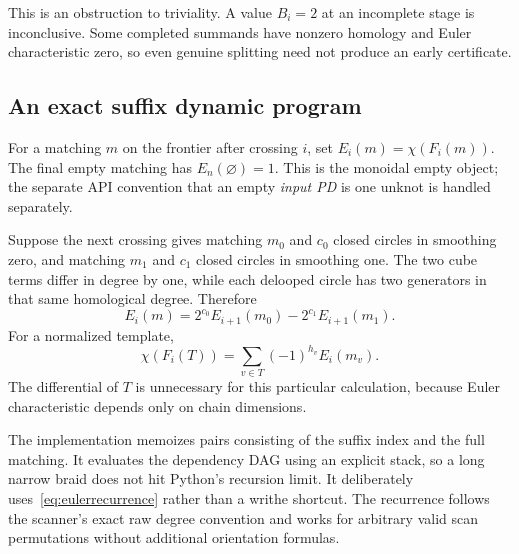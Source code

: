This is an obstruction to triviality. A value $B_i=2$ at an incomplete stage
is inconclusive. Some completed summands have nonzero homology and Euler
characteristic zero, so even genuine splitting need not produce an early
certificate.

\subsection{An exact suffix dynamic program}
For a matching $m$ on the frontier after crossing $i$, set
$E_i(m)=\chi(F_i(m))$. The final empty matching has
$E_n(\varnothing)=1$. This is the monoidal empty object; the separate API
convention that an empty \emph{input PD} is one unknot is handled separately.

Suppose the next crossing gives matching $m_0$ and $c_0$ closed circles in
smoothing zero, and matching $m_1$ and $c_1$ closed circles in smoothing one.
The two cube terms differ in degree by one, while each delooped circle has
two generators in that same homological degree. Therefore
\begin{equation}\label{eq:eulerrecurrence}
 E_i(m)=2^{c_0}E_{i+1}(m_0)-2^{c_1}E_{i+1}(m_1).
\end{equation}
For a normalized template,
\begin{equation}\label{eq:templateeuler}
 \chi(F_i(T))=\sum_{v\in T}(-1)^{h_v}E_i(m_v).
\end{equation}
The differential of $T$ is unnecessary for this particular calculation,
because Euler characteristic depends only on chain dimensions.

The implementation memoizes pairs consisting of the suffix index and the
full matching. It evaluates the dependency DAG using an explicit stack, so
a long narrow braid does not hit Python's recursion limit. It deliberately
uses~\eqref{eq:eulerrecurrence} rather than a writhe shortcut. The recurrence
follows the scanner's exact raw degree convention and works for arbitrary
valid scan permutations without additional orientation formulas.

